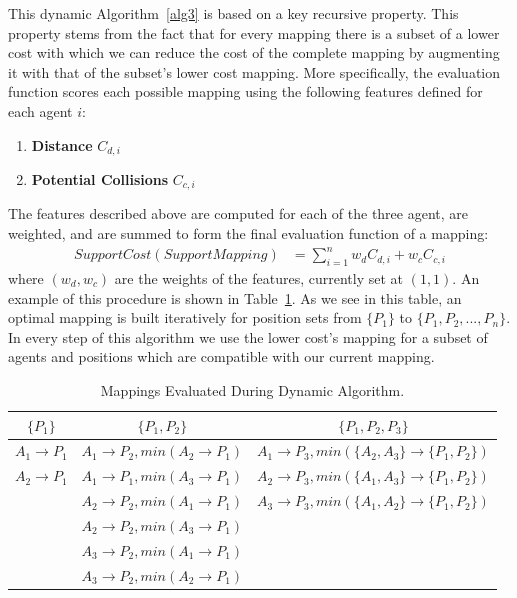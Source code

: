 This dynamic Algorithm~\ref{alg3} is based on a key recursive property. This property stems from the fact that for every mapping there is a subset of a lower cost with which we can reduce the cost of the complete mapping by augmenting it with that of the subset's lower cost mapping.
More specifically, the evaluation function scores each possible mapping using the following features defined for each agent $i$: 
\begin{enumerate}
\item \textbf{Distance} $C_{d,i}$
\item \textbf{Potential Collisions} $C_{c,i}$
\end{enumerate}
The features described above are computed for each of the three agent, are weighted, and are summed to form the final evaluation function of a mapping: 
\begin{align*}
SupportCost(SupportMapping) &= \sum_{i=1}^n w_dC_{d,i}+w_cC_{c,i}
\end{align*}
where $(w_d,w_c)$ are the weights of the features, currently set at $(1,1)$. An example of this procedure is shown in Table~\ref{tab:DynamicTable}. As we see in this table, an optimal mapping is built iteratively for position sets from $\lbrace P_{1} \rbrace$ to $\lbrace P_{1},P_{2},...,P_{n} \rbrace$. In every step of this algorithm we use the lower cost's mapping for a subset of agents and positions which are compatible with our current mapping.
\begin{table}[t!]
\caption{Mappings Evaluated During Dynamic Algorithm.}
\label{tab:DynamicTable}
\centering
	
    \begin{tabular}{ | c | c | c | }
    \hline
    $\lbrace P_{1} \rbrace$   & $\lbrace P_{1},P_{2} \rbrace$ 	& $\lbrace P_{1},P_{2},P_{3} \rbrace$\\ \hline
    $A_{1} \rightarrow P_{1}$ & $A_{1} \rightarrow P_{2},min(A_{2} \rightarrow P_{1})$	 	& $A_{1} \rightarrow P_{3},min(\lbrace A_{2},A_{3} \rbrace \rightarrow \lbrace P_{1},P_{2} \rbrace)$  \\ 
    $A_{2} \rightarrow P_{1}$ & $A_{1} \rightarrow P_{1},min(A_{3} \rightarrow P_{1})$	 	& $A_{2} \rightarrow P_{3},min(\lbrace A_{1},A_{3} \rbrace \rightarrow \lbrace P_{1},P_{2} \rbrace)$  \\ 
     						  & $A_{2} \rightarrow P_{2},min(A_{1} \rightarrow P_{1})$ 		& $A_{3} \rightarrow P_{3},min(\lbrace A_{1},A_{2} \rbrace \rightarrow \lbrace P_{1},P_{2} \rbrace)$  \\ 
       						  & $A_{2} \rightarrow P_{2},min(A_{3} \rightarrow P_{1})$ 		&   \\ 
       						  & $A_{3} \rightarrow P_{2},min(A_{1} \rightarrow P_{1})$ 		&   \\ 
    						  & $A_{3} \rightarrow P_{2},min(A_{2} \rightarrow P_{1})$		&   \\
    \hline
    \end{tabular}      
\end{table}
